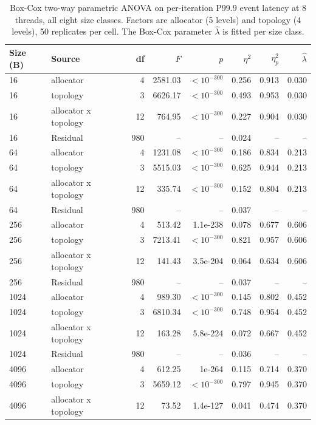 \begin{table}[!htbp]
\centering
\scriptsize
\setlength{\tabcolsep}{3pt}
\caption{Box-Cox two-way parametric ANOVA on per-iteration P99.9 event latency at 8 threads, all eight size classes. Factors are allocator (5 levels) and topology (4 levels), 50 replicates per cell. The Box-Cox parameter $\hat{\lambda}$ is fitted per size class.}
\label{tab:anova-all}
\begin{tabular}{llrrrrrr}
\toprule
Size (B) & Source & df & $F$ & $p$ & $\eta^2$ & $\eta_p^2$ & $\hat{\lambda}$\\
\midrule
16 & allocator & 4 & 2581.03 & $<10^{-300}$ & 0.256 & 0.913 & 0.030 \\
16 & topology & 3 & 6626.17 & $<10^{-300}$ & 0.493 & 0.953 & 0.030 \\
16 & allocator x topology & 12 & 764.95 & $<10^{-300}$ & 0.227 & 0.904 & 0.030 \\
16 & Residual & 980 & -- & -- & 0.024 & -- & -- \\
64 & allocator & 4 & 1231.08 & $<10^{-300}$ & 0.186 & 0.834 & 0.213 \\
64 & topology & 3 & 5515.03 & $<10^{-300}$ & 0.625 & 0.944 & 0.213 \\
64 & allocator x topology & 12 & 335.74 & $<10^{-300}$ & 0.152 & 0.804 & 0.213 \\
64 & Residual & 980 & -- & -- & 0.037 & -- & -- \\
256 & allocator & 4 & 513.42 & 1.1e-238 & 0.078 & 0.677 & 0.606 \\
256 & topology & 3 & 7213.41 & $<10^{-300}$ & 0.821 & 0.957 & 0.606 \\
256 & allocator x topology & 12 & 141.43 & 3.5e-204 & 0.064 & 0.634 & 0.606 \\
256 & Residual & 980 & -- & -- & 0.037 & -- & -- \\
1024 & allocator & 4 & 989.30 & $<10^{-300}$ & 0.145 & 0.802 & 0.452 \\
1024 & topology & 3 & 6810.34 & $<10^{-300}$ & 0.748 & 0.954 & 0.452 \\
1024 & allocator x topology & 12 & 163.28 & 5.8e-224 & 0.072 & 0.667 & 0.452 \\
1024 & Residual & 980 & -- & -- & 0.036 & -- & -- \\
4096 & allocator & 4 & 612.25 & 1e-264 & 0.115 & 0.714 & 0.370 \\
4096 & topology & 3 & 5659.12 & $<10^{-300}$ & 0.797 & 0.945 & 0.370 \\
4096 & allocator x topology & 12 & 73.52 & 1.4e-127 & 0.041 & 0.474 & 0.370 \\

\end{tabular}
\end{table}

